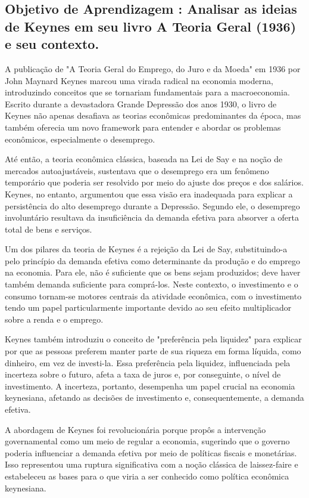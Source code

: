 \documentclass[a4paper,12pt]{article}[abntex2]
\begin{document}
\subsection{\textbf{Objetivo de Aprendizagem : Analisar as ideias de Keynes em seu livro A Teoria Geral (1936) e seu contexto.}}
A publicação de "A Teoria Geral do Emprego, do Juro e da Moeda" em 1936 por John Maynard Keynes marcou uma virada radical na economia moderna, introduzindo conceitos que se tornariam fundamentais para a macroeconomia. Escrito durante a devastadora Grande Depressão dos anos 1930, o livro de Keynes não apenas desafiava as teorias econômicas predominantes da época, mas também oferecia um novo framework para entender e abordar os problemas econômicos, especialmente o desemprego.

Até então, a teoria econômica clássica, baseada na Lei de Say e na noção de mercados autoajustáveis, sustentava que o desemprego era um fenômeno temporário que poderia ser resolvido por meio do ajuste dos preços e dos salários. Keynes, no entanto, argumentou que essa visão era inadequada para explicar a persistência do alto desemprego durante a Depressão. Segundo ele, o desemprego involuntário resultava da insuficiência da demanda efetiva para absorver a oferta total de bens e serviços.

Um dos pilares da teoria de Keynes é a rejeição da Lei de Say, substituindo-a pelo princípio da demanda efetiva como determinante da produção e do emprego na economia. Para ele, não é suficiente que os bens sejam produzidos; deve haver também demanda suficiente para comprá-los. Neste contexto, o investimento e o consumo tornam-se motores centrais da atividade econômica, com o investimento tendo um papel particularmente importante devido ao seu efeito multiplicador sobre a renda e o emprego.

Keynes também introduziu o conceito de "preferência pela liquidez" para explicar por que as pessoas preferem manter parte de sua riqueza em forma líquida, como dinheiro, em vez de investi-la. Essa preferência pela liquidez, influenciada pela incerteza sobre o futuro, afeta a taxa de juros e, por conseguinte, o nível de investimento. A incerteza, portanto, desempenha um papel crucial na economia keynesiana, afetando as decisões de investimento e, consequentemente, a demanda efetiva.

A abordagem de Keynes foi revolucionária porque propôs a intervenção governamental como um meio de regular a economia, sugerindo que o governo poderia influenciar a demanda efetiva por meio de políticas fiscais e monetárias. Isso representou uma ruptura significativa com a noção clássica de laissez-faire e estabeleceu as bases para o que viria a ser conhecido como política econômica keynesiana.
\end{document}
